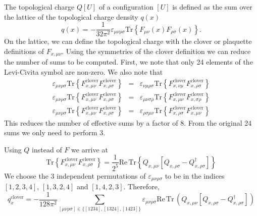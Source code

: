 \documentclass[12pt,a4paper]{article}
\newcommand{\tr}{\text{Tr}\,}
\newcommand{\re}{\text{Re}\,}
\begin{document}
The topological charge $Q[U]$ of a configuration $[U]$ is defined as the sum over the lattice of the topological charge density $q(x)$ 
\begin{equation}
    q(x) = -\frac{1}{32\pi^2}\varepsilon_{\mu\nu\rho\sigma} \text{Tr} \left\{ F_{\mu\nu}(x)F_{\rho\sigma}(x)\right\}.
\end{equation}
On the lattice, we can define the topological charge with the clover or plaquette definitions of $F_{x,\mu\nu}$. Using the symmetries of the clover definition we can reduce the number of sums to be computed. First, we note that only 24 elements of the Levi-Civita symbol are non-zero. We also note that
\begin{eqnarray}
    \varepsilon_{\mu\nu\rho\sigma} \text{Tr} \left\{ F^{\text{clover}}_{x,\mu\nu}F^{\text{clover}}_{x,\rho\sigma}\right\} & = & \varepsilon_{\nu\mu\rho\sigma} \text{Tr} \left\{ F^{\text{clover}}_{x,\nu\mu}F^{\text{clover}}_{x,\rho\sigma}\right\} \\
    \varepsilon_{\mu\nu\rho\sigma} \text{Tr} \left\{ F^{\text{clover}}_{x,\mu\nu}F^{\text{clover}}_{x,\rho\sigma}\right\} & = & \varepsilon_{\mu\nu\sigma\rho} \text{Tr} \left\{ F^{\text{clover}}_{x,\mu\nu}F^{\text{clover}}_{x,\sigma\rho}\right\} \\
    \varepsilon_{\mu\nu\rho\sigma} \text{Tr} \left\{ F^{\text{clover}}_{x,\mu\nu}F^{\text{clover}}_{x,\rho\sigma}\right\} & = & \varepsilon_{\rho\sigma\mu\nu} \text{Tr} \left\{F^{\text{clover}}_{x,\rho\sigma}F^{\text{clover}}_{x,\mu\nu}\right\}
\end{eqnarray} 
This reduces the number of effective sums by a factor of 8. From the original 24 sums we only need to perform 3.

Using $Q$ instead of $F$ we arrive at
\begin{equation}
    \text{Tr}\left\{F^{\text{clover}}_{x,\mu\nu}F^{\text{clover}}_{x,\rho\sigma}\right\} =\frac{1}{2^5} \re\text{Tr}\left\{Q_{x,\mu\nu}\left[Q_{x,\rho\sigma}-Q_{x,\rho\sigma}^{\dagger}\right]\right\}
\end{equation}
We choose the 3 independent permutations of $\varepsilon_{\mu\nu\rho\sigma}$ to be in the indices $[1,2,3,4]$, $[1,3,2,4]$ and $[1,4,2,3]$. Therefore,
\begin{equation}
    q^{\text{clover}}_x = -\frac{1}{128 \pi^2} \sum_{[\mu\nu\rho\sigma] \in\{ [1234], [1324], [1423]\}}
              \varepsilon_{\mu\nu\rho\sigma}\re\tr\left(Q_{x,\mu\nu}\left[Q_{x,\rho\sigma}-Q_{x,\rho\sigma}^{\dagger}\right]\right) 
\end{equation}
\end{document}
